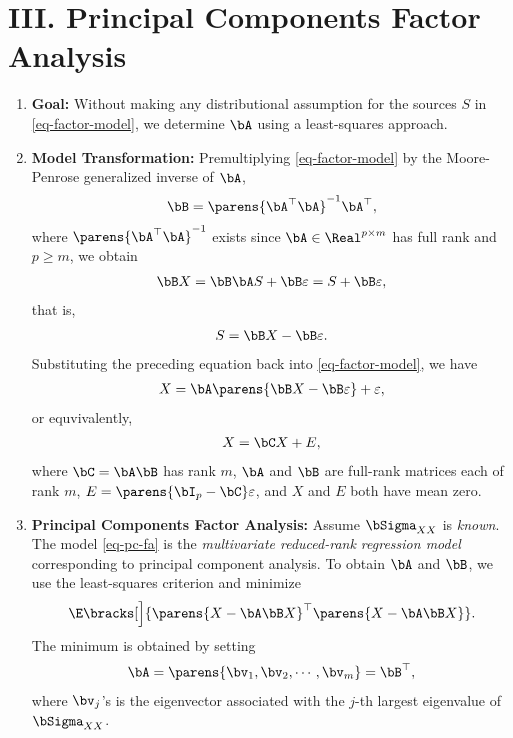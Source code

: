 \documentclass[12pt]{article}
\begin{document}
\section*{III. Principal Components Factor Analysis}

\begin{enumerate}[label=\textbf{\arabic*.}]

	\item \textbf{Goal:} Without making any distributional assumption for the sources $S$ in \eqref{eq-factor-model}, we determine $\bA$ using a least-squares approach. 
	
	\item \textbf{Model Transformation:} Premultiplying \eqref{eq-factor-model} by the Moore-Penrose generalized inverse of $\bA$, 
	\begin{align}
		\bB = \parens{\bA^\top \bA}^{-1} \bA^\top,  
	\end{align}
	where $\parens{\bA^\top \bA}^{-1}$ exists since $\bA \in \Real^{p \times m}$ has full rank and $p \ge m$, we obtain 
	\begin{align*}
		\bB X = \bB \bA S + \bB \varepsilon = S + \bB \varepsilon, 
	\end{align*}
	that is, 
	\begin{align*}
		S = \bB X - \bB \varepsilon. 
	\end{align*}
	Substituting the preceding equation back into \eqref{eq-factor-model}, we have 
	\begin{align*}
		X = \bA \parens{\bB X - \bB \varepsilon} + \varepsilon, 
	\end{align*}
	or equvivalently, 
	\begin{align}\label{eq-pc-fa}
		X = \bC X + E, 
	\end{align}
	where $\bC = \bA \bB$ has rank $m$, $\bA$ and $\bB$ are full-rank matrices each of rank $m$, $E = \parens{\bI_p - \bC} \varepsilon$, and $X$ and $E$ both have mean zero. 
	
	\item \textbf{Principal Components Factor Analysis:} Assume $\bSigma_{XX}$ is \emph{known}. The model \eqref{eq-pc-fa} is the \emph{multivariate reduced-rank regression model} corresponding to principal component analysis. To obtain $\bA$ and $\bB$, we use the least-squares criterion and minimize 
	\begin{align}
		\E \bracks[\Big]{\parens{X - \bA \bB X}^\top \parens{X - \bA \bB X}}. 
	\end{align}
	The minimum is obtained by setting 
	\begin{align*}
		\bA = \parens{\bv_1, \bv_2, \cdots, \bv_m} = \bB^\top, 
	\end{align*}
	where $\bv_j$'s is the eigenvector associated with the $j$-th largest eigenvalue of $\bSigma_{XX}$. 
	

\end{enumerate}
\end{document}
